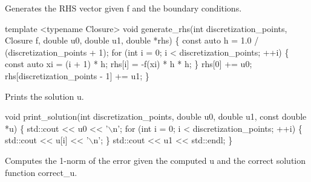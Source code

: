 Generates the R\+HS vector given {\ttfamily f} and the boundary conditions.


\begin{DoxyCode}
\textcolor{keyword}{template} <\textcolor{keyword}{typename} Closure>
\textcolor{keywordtype}{void} generate\_rhs(\textcolor{keywordtype}{int} discretization\_points, Closure f, \textcolor{keywordtype}{double} u0, \textcolor{keywordtype}{double} u1,
                  \textcolor{keywordtype}{double} *rhs)
\{
    \textcolor{keyword}{const} \textcolor{keyword}{auto} h = 1.0 / (discretization\_points + 1);
    \textcolor{keywordflow}{for} (\textcolor{keywordtype}{int} i = 0; i < discretization\_points; ++i) \{
        \textcolor{keyword}{const} \textcolor{keyword}{auto} xi = (i + 1) * h;
        rhs[i] = -f(xi) * h * h;
    \}
    rhs[0] += u0;
    rhs[discretization\_points - 1] += u1;
\}
\end{DoxyCode}


Prints the solution {\ttfamily u}.


\begin{DoxyCode}
\textcolor{keywordtype}{void} print\_solution(\textcolor{keywordtype}{int} discretization\_points, \textcolor{keywordtype}{double} u0, \textcolor{keywordtype}{double} u1,
                    \textcolor{keyword}{const} \textcolor{keywordtype}{double} *u)
\{
    std::cout << u0 << \textcolor{charliteral}{'\(\backslash\)n'};
    \textcolor{keywordflow}{for} (\textcolor{keywordtype}{int} i = 0; i < discretization\_points; ++i) \{
        std::cout << u[i] << \textcolor{charliteral}{'\(\backslash\)n'};
    \}
    std::cout << u1 << std::endl;
\}
\end{DoxyCode}


Computes the 1-\/norm of the error given the computed {\ttfamily u} and the correct solution function {\ttfamily correct\+\_\+u}.


